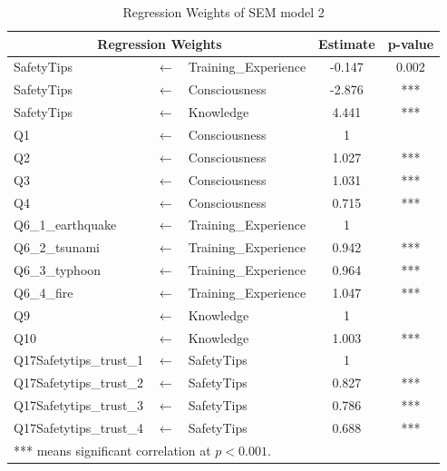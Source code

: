 \begin{table}[t]
  \caption{Regression Weights of SEM model 2 }
  \label{table11}
  \centering
  \begin{tabular}{lcl|c|c}
 \hline
 \multicolumn{3}{c|}{Regression Weights} & Estimate & p-value \\
 \hline
SafetyTips              &$\longleftarrow$ & Training\_Experience & -0.147 & 0.002                \\
SafetyTips              &$\longleftarrow$ & Consciousness        & -2.876 & ***                  \\
SafetyTips              &$\longleftarrow$ & Knowledge            & 4.441  & ***                  \\
Q1                      &$\longleftarrow$ & Consciousness        & 1      &  \\
Q2                      &$\longleftarrow$ & Consciousness        & 1.027  & ***                  \\
Q3                      &$\longleftarrow$ & Consciousness        & 1.031  & ***                  \\
Q4                      &$\longleftarrow$ & Consciousness        & 0.715  & ***                  \\
Q6\_1\_earthquake       &$\longleftarrow$ & Training\_Experience & 1      &  \\
Q6\_2\_tsunami          &$\longleftarrow$ & Training\_Experience & 0.942  & ***                  \\
Q6\_3\_typhoon          &$\longleftarrow$ & Training\_Experience & 0.964  & ***                  \\
Q6\_4\_fire             &$\longleftarrow$ & Training\_Experience & 1.047  & ***                  \\
Q9                      &$\longleftarrow$ & Knowledge            & 1      &  \\
Q10                     &$\longleftarrow$ & Knowledge            & 1.003  & ***                  \\
Q17Safetytips\_trust\_1 &$\longleftarrow$ & SafetyTips           & 1      &  \\
Q17Safetytips\_trust\_2 &$\longleftarrow$ & SafetyTips           & 0.827  & ***                  \\
Q17Safetytips\_trust\_3 &$\longleftarrow$ & SafetyTips           & 0.786  & ***                  \\
Q17Safetytips\_trust\_4 &$\longleftarrow$ & SafetyTips           & 0.688  & ***                 \\
 \hline
\multicolumn{5}{l}{*** means significant correlation at $p<0.001$.}
  \end{tabular}
\end{table}

